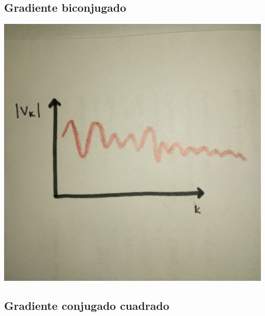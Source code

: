 \subsection{Gradiente biconjugado}
\begin{center}
\includegraphics[scale=.05]{imagenes/8.jpg}
\end{center}
\subsection{Gradiente conjugado cuadrado}

